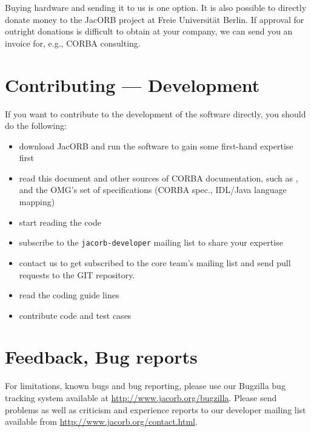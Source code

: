 Buying hardware and sending it to us is one option. It is also
possible to directly donate money to the JacORB project at Freie
Universit{\"a}t Berlin. If approval for outright donations is
difficult to obtain at your company, we can send you an invoice for,
e.g., CORBA consulting.

\section{Contributing --- Development}

If you want to contribute to the development of the software directly,
you should do the following:

\begin{itemize}
\item download JacORB and run the software to gain some first-hand
  expertise first
\item read this document and other sources of CORBA documentation,
  such as \cite{Brose2001a}, and the OMG's set of specifications
  (CORBA spec., IDL/Java language mapping)
\item start reading the code
\item subscribe to the {\tt jacorb-developer} mailing list to share
  your expertise
\item contact us to get subscribed to the core team's mailing list and
  send pull requests to the GIT repository.
\item read the coding guide lines
\item contribute code and test cases
\end{itemize}

\section{Feedback, Bug reports}

For limitations, known bugs and bug reporting, please use our Bugzilla
bug tracking system available at
\href{http://www.jacorb.org/bugzilla}{http://www.jacorb.org/bugzilla}.
Please send problems as well as criticism and experience reports to our
developer mailing list available from
\href{http://www.jacorb.org/contact.html}{http://www.jacorb.org/contact.html}.


